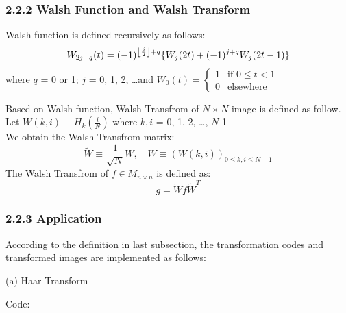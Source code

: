 \documentclass[12pt]{article}
\DeclarePairedDelimiter\floor{\lfloor}{\rfloor}
\begin{document}
\subsubsection*{2.2.2 \quad Walsh Function and Walsh Transform}
Walsh function is defined recursively as follows: 
\begin{equation*}
    W_{2j+q}(t) = (-1)^{\floor*{\frac{j}{2}}+q} \{W_j(2t)+(-1)^{j+q}W_j(2t-1)\}
\end{equation*} 
where $q$ = 0 or 1; $j$ = 0, 1, 2, \dots and $W_0(t) = \begin{cases}
        1 & \text{if $0 \leq t < 1$}\\
        0 & \text{elsewhere}
    \end{cases}$\\
\begin{flushleft}
Based on Walsh function, Walsh Transfrom of $N\times N$ image is defined as follow.\\
Let $W(k,i) \equiv H_{k}\left(\frac{i}{N}\right)$ where $k,i$ = 0, 1, 2, \ldots, $N$-1 \\
We obtain the Walsh Transfrom matrix:
\begin{equation*}
 \tilde{W} \equiv\frac{1}{\sqrt{N}}W, \quad W \equiv(W (k,i))_{0\leqslant k,i \leqslant N-1}
\end{equation*}
The Walsh Transfrom of $f \in M_{n\times n}$ is defined as:
\begin{equation*}
    g = \tilde{W}f\tilde{W}^T
\end{equation*}
\end{flushleft} 

\subsubsection*{2.2.3 \quad Application}
According to the definition in last subsection, the transformation codes and transformed images are implemented as follows:
\begin{flushleft}
(a) Haar Transform 

Code:
\end{flushleft}
\end{document}
